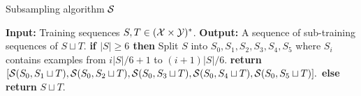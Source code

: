 \begin{algorithm}[H]
    \caption{Subsampling algorithm $\mathcal{S}$}\label{alg:Subsample}
    \begin{algorithmic}[1]
        \State \textbf{Input:} Training sequences $S,T \in (\mathcal{X} \times \mathcal{Y})^{*}$.
        \State \textbf{Output:} A sequence of sub-training sequences of $S \sqcup T$.
        \State \textbf{if $|S| \geq 6$ then}
            \State\hspace{0.4cm}Split $S$ into $S_0, S_1, S_2, S_3, S_4, S_5$ where $S_i$ contains examples from  $i|S|/6+1$ to $(i+1)|S|/6$.\label{alg:Subsample:recursion}
            \State\hspace{0.4cm}\textbf{return} $[\mathcal{S}(S_0, S_1 \sqcup T), \mathcal{S}(S_0, S_2 \sqcup T), \mathcal{S}(S_0, S_3 \sqcup T), \mathcal{S}(S_0, S_4 \sqcup T), \mathcal{S}(S_0, S_5 \sqcup T)].$\label{alg:Subsample:recursion2}
        \State \textbf{else}
            \State\hspace{0.4cm}\textbf{return} $S \sqcup T.$\label{alg:Subsample:recursion3}
    \end{algorithmic}
\end{algorithm}
